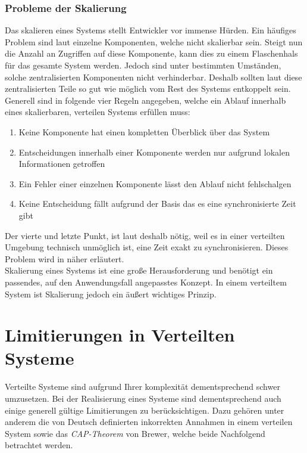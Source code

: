 \subsubsection{Probleme der Skalierung}
Das skalieren eines Systems stellt Entwickler vor immense Hürden. Ein häufiges Problem sind laut \cite{tanenbaum2007distributed} einzelne Komponenten, welche nicht skalierbar sein. Steigt nun die Anzahl an Zugriffen auf diese Komponente, kann dies zu einem Flaschenhals für das gesamte System werden. Jedoch sind unter bestimmten Umständen, solche zentralisierten Komponenten nicht verhinderbar. Deshalb sollten laut \cite{tanenbaum2007distributed} diese zentralisierten Teile so gut wie möglich vom Rest des Systems entkoppelt sein. Generell sind in \cite{tanenbaum2007distributed} folgende vier Regeln angegeben, welche ein Ablauf innerhalb eines skalierbaren, verteilen Systems erfüllen muss:
\begin{enumerate}
    \item Keine Komponente hat einen kompletten Überblick über das System
    \item Entscheidungen innerhalb einer Komponente werden nur aufgrund lokalen Informationen getroffen
    \item Ein Fehler einer einzelnen Komponente lässt den Ablauf nicht fehlschalgen
    \item Keine Entscheidung fällt aufgrund der Basis das es eine synchronisierte Zeit gibt
\end{enumerate}
Der vierte und letzte Punkt, ist laut \cite{tanenbaum2007distributed} deshalb nötig, weil es in einer verteilten Umgebung technisch unmöglich ist, eine Zeit exakt zu synchronisieren. Dieses Problem wird in \cite{lamport1978time} näher erläutert.\\
Skalierung eines Systems ist eine große Herausforderung und benötigt ein passendes, auf den Anwendungsfall angepasstes Konzept. In einem verteiltem System ist Skalierung jedoch ein äußert wichtiges Prinzip. \cite{tanenbaum2007distributed}
 
\section{Limitierungen in Verteilten Systeme}
Verteilte Systeme sind aufgrund Ihrer komplexität dementsprechend schwer umzusetzen. Bei der Realisierung eines Systeme sind dementsprechend auch einige generell gültige Limitierungen zu berücksichtigen. Dazu gehören unter anderem die von Deutsch definierten inkorrekten Annahmen in einem verteilen System sowie das \textit{CAP-Theorem} von Brewer, welche beide Nachfolgend betrachtet werden.

